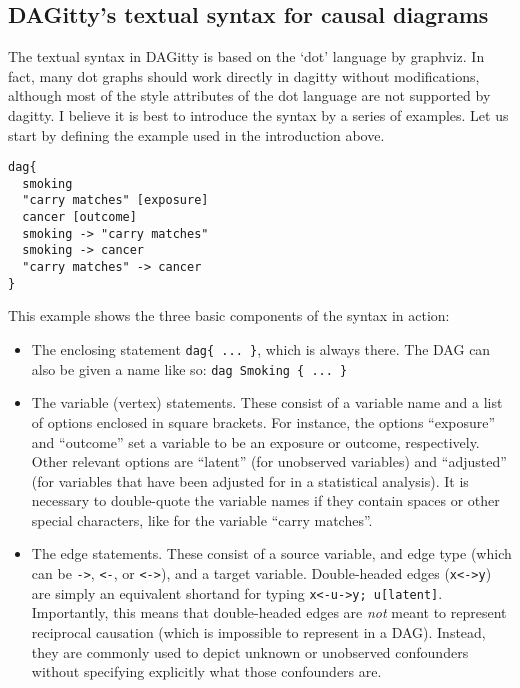 \documentclass[a4paper]{article} %
\makeatletter
\newcommand{\pp}{{\sc DAG}itty\xspace}
\newenvironment{kframe}{%
 \def\at@end@of@kframe{}%
 \ifinner\ifhmode%
  \def\at@end@of@kframe{\end{minipage}}%
  \begin{minipage}{\columnwidth}%
 \fi\fi%
 \def\FrameCommand##1{\hskip\@totalleftmargin \hskip-\fboxsep
 \colorbox{shadecolor}{##1}\hskip-\fboxsep
     \hskip-\linewidth \hskip-\@totalleftmargin \hskip\columnwidth}%
 \MakeFramed {\advance\hsize-\width
   \@totalleftmargin\z@ \linewidth\hsize
   \@setminipage}}%
 {\par\unskip\endMakeFramed%
 \at@end@of@kframe}
\makeatother
\begin{document}
\subsection{\pp's textual syntax for causal diagrams} 

The textual syntax in DAGitty is based on the ‘dot’ language by graphviz. In fact, many dot graphs should work directly in dagitty without modifications, although most of the style attributes of the dot language are not supported by dagitty.
I believe it is best to introduce the syntax by a series of examples. Let us start by defining the example used in the introduction above.

\begin{kframe}
\begin{verbatim}
dag{ 
  smoking
  "carry matches" [exposure]
  cancer [outcome]
  smoking -> "carry matches"
  smoking -> cancer
  "carry matches" -> cancer
}
\end{verbatim}
\end{kframe}

This example shows the three basic components of the syntax in action:
\begin{itemize}
\item The enclosing statement \verb'dag{ ... }', which is always there. The DAG can also be given a name like so: \verb'dag Smoking { ... }'

\item The variable (vertex) statements. These consist of a variable name and a list of options enclosed in square brackets. For instance, the options ``exposure'' and ``outcome'' set a variable to be an exposure or outcome, respectively. Other relevant options are ``latent'' (for unobserved variables) and ``adjusted'' (for variables that have been adjusted for in a statistical analysis). It is necessary to double-quote the variable names if they contain spaces or other special characters, like for the variable ``carry matches''.

\item The edge statements. These consist of a source variable, and edge type (which can be  \verb|->|, \verb|<-|, or \verb|<->|), and a target variable. Double-headed edges (\verb|x<->y|) are simply an equivalent shortand for typing \verb|x<-u->y; u[latent]|. Importantly, this means that double-headed edges are \emph{not} meant to represent reciprocal causation (which is impossible to represent in a DAG). Instead, they are commonly used to depict unknown or unobserved confounders without specifying explicitly what those confounders are. 
\end{itemize}
\end{document}
